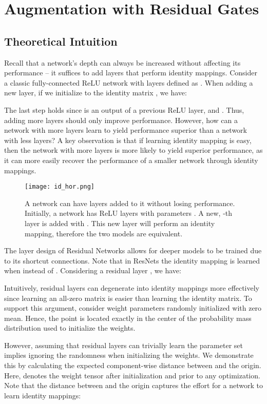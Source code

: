 \documentclass{article} \RequirePackage{amsmath,amsthm,amsfonts,amssymb}
\begin{document}
\section{Augmentation with Residual Gates}

\subsection{Theoretical Intuition}

Recall that a network's depth can always be increased without affecting its performance -- it suffices to add layers that perform identity mappings. Consider a classic fully-connected ReLU network with layers defined as . When adding a new layer, if we initialize  to the identity matrix , we have:

The last step holds since  is an output of a previous ReLU layer, and . Thus, adding more layers should only improve performance. However, how can a network with more layers learn to yield performance superior than a network with less layers? A key observation is that if learning identity mapping is easy, then the network with more layers is more likely to yield superior performance, as it can more easily recover the performance of a smaller network through identity mappings. 



\begin{figure}[!ht]
  \centering
    \texttt{[image: id\_hor.png]}
  \caption{A network can have layers added to it without losing performance. Initially, a network has  ReLU layers with parameters . A new, -th layer is added with . This new layer will perform an identity mapping, therefore the two models are equivalent.}
\label{id}
\end{figure}


The layer design of Residual Networks allows for deeper models to be trained due to its shortcut connections. Note that in ResNets the identity mapping is learned when  instead of . Considering a residual layer , we have:

Intuitively, residual layers can degenerate into identity mappings more effectively since learning an all-zero matrix is easier than learning the identity matrix. To support this argument, consider weight parameters randomly initialized with zero mean. Hence, the point  is located exactly in the center of the probability mass distribution used to initialize the weights.



However, assuming that residual layers can trivially learn the parameter set  implies ignoring the randomness when initializing the weights. We demonstrate this by calculating the expected component-wise distance between  and the origin. Here,  denotes the weight tensor after initialization and prior to any optimization. Note that the distance between  and the origin captures the effort for a network to learn identity mappings:
\end{document}
